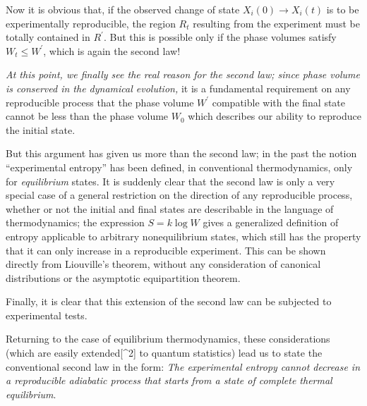 \documentclass[twocolumn]{article}
\begin{document}
Now it is obvious that, if the observed change of state
\(X_{i}\left( 0 \right) \rightarrow X_{i}\left( t \right)\) is to be
experimentally reproducible, the region \(R_{t}\) resulting from the
experiment must be totally contained in \(R^{\prime}\). But this is possible
only if the phase volumes satisfy \(W_{t} \leq W^{\prime}\), which is again the
second law!

\emph{At this point, we finally see the real reason for the second law;
since phase volume is conserved in the dynamical evolution,} it is a
fundamental requirement on any reproducible process that the phase
volume \(W^{\prime}\) compatible with the final state cannot be less than the
phase volume \(W_{0}\) which describes our ability to reproduce the
initial state.

But this argument has given us more than the second law; in the past the
notion ``experimental entropy'' has been defined, in conventional
thermodynamics, only for \emph{equilibrium} states. It is suddenly clear
that the second law is only a very special case of a general restriction
on the direction of any reproducible process, whether or not the initial
and final states are describable in the language of thermodynamics; the
expression \(S = k\log W\) gives a generalized definition of entropy
applicable to arbitrary nonequilibrium states, which still has the
property that it can only increase in a reproducible experiment. This
can be shown directly from Liouville's theorem, without any
consideration of canonical distributions or the asymptotic equipartition
theorem.

Finally, it is clear that this extension of the second law can be
subjected to experimental tests.

Returning to the case of equilibrium thermodynamics, these
considerations (which are easily extended{[}\^{}2{]} to quantum
statistics) lead us to state the conventional second law in the form:
\emph{The experimental entropy cannot decrease in a reproducible
adiabatic process that starts from a state of complete thermal
equilibrium}.
\end{document}
